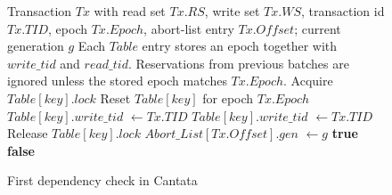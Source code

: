 \documentclass[english,preprint,JIP]{ipsj}
\begin{document}
\begin{figure}[!t]
\begin{algorithm}[H]
    \caption{First dependency check in Cantata}
    \label{alg1}
    \begin{algorithmic}[1]  
    \Require Transaction $Tx$ with read set $Tx.RS$, write set $Tx.WS$, transaction id $Tx.TID$, epoch $Tx.Epoch$, abort-list entry $Tx.Offset$; current generation $g$
    \Statex Each $\textit{Table}$ entry stores an epoch together with $write\_tid$ and $read\_tid$. Reservations from previous batches are ignored unless the stored epoch matches $Tx.Epoch$.
    \State
            \State Acquire $\textit{Table}[key].lock$
                \State Reset $\textit{Table}[key]$ for epoch $Tx.Epoch$
                \State $\textit{Table}[key].write\_tid$ $\gets Tx.TID$
                \State $\textit{Table}[key].write\_tid$ $\gets Tx.TID$
            \EndIf
            \State Release $\textit{Table}[key].lock$
        \EndFor
    \EndFunction
    \State
                \State $Abort\_List[Tx.Offset].gen$ $\gets g$
                \State \Return \textbf{true}
            \EndIf
        \EndFor
        \State \Return \textbf{false}
    \EndFunction
    \end{algorithmic}
\end{algorithm}
\end{figure}
\end{document}
